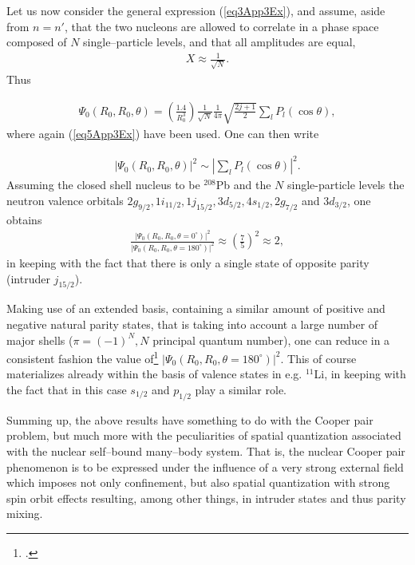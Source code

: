 \begin{subappendices}
Let us now consider the general expression (\ref{eq3App3Ex}), and assume, aside from $n=n'$, that  the two nucleons are allowed to correlate in a phase space composed of $N$ single--particle levels, and that all amplitudes are equal,
 \begin{align}\label{eq8App3E}
X\approx\frac{1}{\sqrt{N}}.
 \end{align}
Thus 

 \begin{align}\label{eq9App3E}
\Psi_0(R_0,R_0,\theta)
=\left(\frac{1.4}{R_0^3}\right)\frac{1}{\sqrt{N}}\frac{1}{4\pi}\sqrt{\frac{2j+1}{2}}\sum_lP_l(\cos\theta),
 \end{align}
where again (\ref{eq5App3Ex}) have been used. One can then  write 

\begin{align}\label{eq10App3E}
|\Psi_0(R_0,R_0,\theta)|^2\sim |\sum_lP_l(\cos\theta)|^2.
\end{align}
Assuming the closed shell nucleus to be $^{208}$Pb and  the $N$ single-particle levels  the neutron valence orbitals $2g_{9/2},1i_{11/2},1j_{15/2},3d_{5/2},4s_{1/2},2g_{7/2}$ and $3d_{3/2}$, one obtains
\begin{align}\label{eq11App3E}
\frac{|\Psi_0(R_0,R_0,\theta=0^\circ)|^2}{|\Psi_0(R_0,R_0,\theta=180^\circ)|^2}\approx\left(\frac{7}{5}\right)^2\approx2,
\end{align}
in keeping with the fact that there is only a single state of opposite parity (intruder $j_{15/2}$).

Making use of an extended basis, containing a similar amount of positive and negative natural parity states, that is taking into account a large number of major shells ($\pi=(-1)^N, N$ principal quantum number), one can reduce in a consistent fashion the value of\footnote{\cite{Ferreira:84}.} $|\Psi_0(R_0,R_0,\theta=180^\circ)|^2$.
This of course materializes already within the basis of valence states in e.g. $^{11}$Li, in keeping with the fact that in this case $s_{1/2}$ and $p_{1/2}$ play a similar role. 


Summing up, the above results have something to do with the Cooper pair problem, but much more with the peculiarities of spatial quantization associated with the nuclear self--bound many--body system. That is, the nuclear Cooper pair phenomenon  is to be expressed under the influence of a very strong external field which imposes not only confinement, but also spatial quantization with strong spin orbit effects resulting, among other things, in intruder states and thus parity mixing.   

\end{subappendices}
